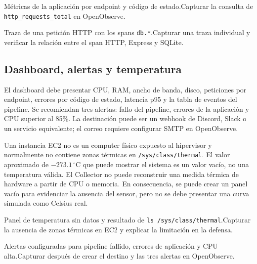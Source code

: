 \documentclass[12pt,a4paper]{article}
\begin{document}
\begin{pendingfigure}{Métricas de la aplicación por endpoint y código de estado.}{Capturar la consulta de \texttt{http\_requests\_total} en OpenObserve.}
\label{fig:metricas}
\end{pendingfigure}

\begin{pendingfigure}{Traza de una petición HTTP con los spans \texttt{db.*}.}{Capturar una traza individual y verificar la relación entre el span HTTP, Express y SQLite.}
\label{fig:traza}
\end{pendingfigure}

\subsection{Dashboard, alertas y temperatura}

El dashboard debe presentar CPU, RAM, ancho de banda, disco, peticiones por endpoint, errores por código de estado, latencia p95 y la tabla de eventos del pipeline. Se recomiendan tres alertas: fallo del pipeline, errores de la aplicación y CPU superior al 85\%. La destinación puede ser un webhook de Discord, Slack o un servicio equivalente; el correo requiere configurar SMTP en OpenObserve.

Una instancia EC2 no es un computer físico expuesto al hipervisor y normalmente no contiene zonas térmicas en \texttt{/sys/class/thermal}. El valor aproximado de $-273.1\,^\circ$C que puede mostrar el sistema es un valor vacío, no una temperatura válida. El Collector no puede reconstruir una medida térmica de hardware a partir de CPU o memoria. En consecuencia, se puede crear un panel vacío para evidenciar la ausencia del sensor, pero no se debe presentar una curva simulada como Celsius real.

\begin{pendingfigure}{Panel de temperatura sin datos y resultado de \texttt{ls /sys/class/thermal}.}{Capturar la ausencia de zonas térmicas en EC2 y explicar la limitación en la defensa.}
\label{fig:temperatura}
\end{pendingfigure}

\begin{pendingfigure}{Alertas configuradas para pipeline fallido, errores de aplicación y CPU alta.}{Capturar después de crear el destino y las tres alertas en OpenObserve.}
\label{fig:alertas}
\end{pendingfigure}

\end{document}
